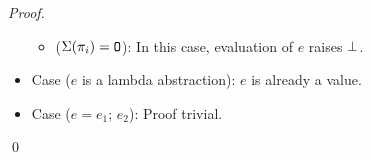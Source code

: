 \begin{proof}
\begin{itemize}
\begin{itemize}
    \item ($\Sigma(\pi_i) = \mathtt{O}$): In this case, evaluation of $e$ raises $\bot$.
  \end{itemize}

  \item Case ($e$ is a lambda abstraction): $e$ is already a value.

  \item Case ($e = e_1;\,e_2$): Proof trivial.
\end{itemize}

\qed
\end{proof}

